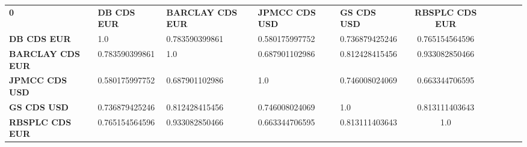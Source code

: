 \begin{tabular}{|l|l|l|l|l|c|c|c|c|c|}
\hline
\textbf{0} & \textbf{DB CDS EUR} & \textbf{BARCLAY CDS EUR} & \textbf{JPMCC CDS USD} & \textbf{GS CDS USD} & \textbf{RBSPLC CDS EUR}\\\hhline{|=|=|=|=|=|=|}
\textbf{DB CDS EUR} & 1.0 & 0.783590399861 & 0.580175997752 & 0.736879425246 & 0.765154564596\\
\textbf{BARCLAY CDS EUR} & 0.783590399861 & 1.0 & 0.687901102986 & 0.812428415456 & 0.933082850466\\
\textbf{JPMCC CDS USD} & 0.580175997752 & 0.687901102986 & 1.0 & 0.746008024069 & 0.663344706595\\
\textbf{GS CDS USD} & 0.736879425246 & 0.812428415456 & 0.746008024069 & 1.0 & 0.813111403643\\
\textbf{RBSPLC CDS EUR} & 0.765154564596 & 0.933082850466 & 0.663344706595 & 0.813111403643 & 1.0\\
\hline
\end{tabular}
